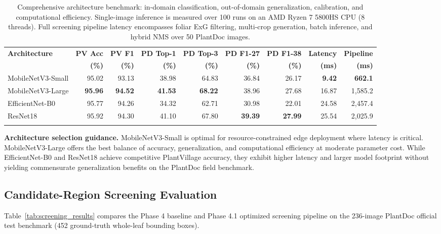 \documentclass[pdflatex,sn-mathphys-num]{sn-jnl}
\theoremstyle{thmstyleone}%
\theoremstyle{thmstyletwo}%
\theoremstyle{thmstylethree}%
\begin{document}
\begin{table}[htbp]
\caption{Comprehensive architecture benchmark: in-domain classification, out-of-domain generalization, calibration, and computational efficiency. Single-image inference is measured over 100 runs on an AMD Ryzen 7 5800HS CPU (8 threads). Full screening pipeline latency encompasses foliar ExG filtering, multi-crop generation, batch inference, and hybrid NMS over 50 PlantDoc images.}\label{tab:full_comparison}%
\footnotesize
\setlength{\tabcolsep}{1.5pt}%
\begin{tabular*}{\textwidth}{@{\extracolsep\fill}lrrrrrrrr}
\toprule
\textbf{Architecture} & \textbf{PV Acc} & \textbf{PV F1} & \textbf{PD Top-1} & \textbf{PD Top-3} & \textbf{PD F1-27} & \textbf{PD F1-38} & \textbf{Latency} & \textbf{Pipeline} \\
& \textbf{(\%)} & \textbf{(\%)} & \textbf{(\%)} & \textbf{(\%)} & \textbf{(\%)} & \textbf{(\%)} & \textbf{(ms)} & \textbf{(ms)} \\
\midrule
MobileNetV3-Small  & 95.02 & 93.13 & 38.98 & 64.83 & 36.84 & 26.17 & \textbf{9.42}  & \textbf{662.1} \\
MobileNetV3-Large  & \textbf{95.96} & \textbf{94.52} & \textbf{41.53} & \textbf{68.22} & 38.96 & 27.68 & 16.87 & 1{,}585.2 \\
EfficientNet-B0    & 95.77 & 94.26 & 34.32 & 62.71 & 30.98 & 22.01 & 24.58 & 2{,}457.4 \\
ResNet18           & 95.92 & 94.30 & 41.10 & 67.80 & \textbf{39.39} & \textbf{27.99} & 25.54 & 2{,}025.9 \\
\botrule
\end{tabular*}
\end{table}

\textbf{Architecture selection guidance.} MobileNetV3-Small is optimal for
resource-constrained edge deployment where latency is critical. MobileNetV3-Large
offers the best balance of accuracy, generalization, and computational efficiency at moderate
parameter cost. While EfficientNet-B0 and ResNet18 achieve competitive PlantVillage accuracy,
they exhibit higher latency and larger model footprint without yielding commensurate
generalization benefits on the PlantDoc field benchmark.

\subsection{Candidate-Region Screening Evaluation}
\label{sec:results_screening}

Table~\ref{tab:screening_results} compares the Phase 4 baseline and Phase 4.1 optimized
screening pipeline on the 236-image PlantDoc official test benchmark (452 ground-truth
whole-leaf bounding boxes).
\end{document}
